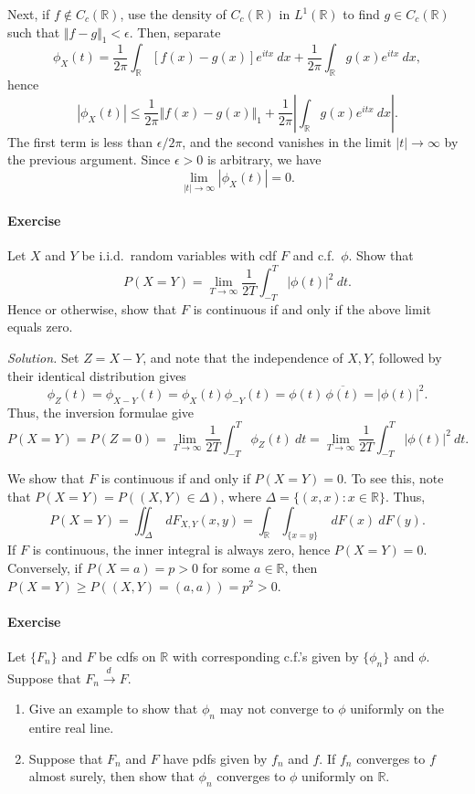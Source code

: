 \documentclass[10pt]{article}
\newcounter{prob}
\newcommand{\problem}{\stepcounter{prob}\paragraph{Exercise \arabic{prob}}}
\newcommand{\solution}{\textit{Solution.} }
\newcommand{\R}{\mathbb{R}}
\newcommand{\tod}{\overset{d\,}{\longrightarrow}}
\begin{document}
    Next, if $f \notin C_c(\R)$, use the density of $C_c(\R)$ in $L^1(\R)$ to find $g
    \in C_c(\R)$ such that $\Vert f - g\Vert_1 < \epsilon$. Then, separate \[
        \phi_X(t) = \frac{1}{2\pi} \int_\R [f(x) - g(x)] e^{itx}\:dx + \frac{1}{2\pi}
        \int_\R g(x) e^{itx}\:dx,
    \] hence \[
        |\phi_X(t)| \leq \frac{1}{2\pi} \Vert f(x) - g(x)\Vert_1 + \frac{1}{2\pi}
        |\int_\R g(x) e^{itx}\:dx|.
    \] The first term is less than $\epsilon / 2\pi$, and the second vanishes in the
    limit $|t| \to \infty$ by the previous argument. Since $\epsilon > 0$ is
    arbitrary, we have \[
        \lim_{|t| \to \infty} |\phi_X(t)| = 0.
    \]


    \problem Let $X$ and $Y$ be i.i.d.\ random variables with cdf $F$ and c.f.\
    $\phi$. Show that \[
        P(X = Y) = \lim_{T \to \infty} \frac{1}{2T} \int_{-T}^T |\phi(t)|^2 \:dt.
    \] Hence or otherwise, show that $F$ is continuous if and only if the above limit
    equals zero.

    \solution Set $Z = X - Y$, and note that the independence of $X, Y$, followed by
    their identical distribution gives \[
        \phi_{Z}(t) = \phi_{X - Y}(t) = \phi_{X}(t) \phi_{-Y}(t) = \phi(t)\,
        \overline{\phi(t)} = |\phi(t)|^2.
    \] Thus, the inversion formulae give \[
        P(X = Y) = P(Z = 0) = \lim_{T \to \infty} \frac{1}{2T} \int_{-T}^T \phi_Z(t)
        \:dt = \lim_{T \to \infty} \frac{1}{2T} \int_{-T}^T |\phi(t)|^2 \:dt.
    \]

    We show that $F$ is continuous if and only if $P(X = Y) = 0$. To see this, note
    that $P(X = Y) = P((X, Y) \in \Delta)$, where $\Delta = \{(x, x) : x \in \R\}$.
    Thus, \[
        P(X = Y) = \iint_\Delta \:dF_{X, Y}(x, y) = \int_\R \int_{\{x = y\}} \:dF(x)
        \:dF(y).
    \] If $F$ is continuous, the inner integral is always zero, hence $P(X = Y) = 0$.
    Conversely, if $P(X = a) = p > 0$ for some $a \in \R$, then $P(X = Y) \geq P((X,
    Y) = (a, a)) = p^2 > 0$.


    \problem Let $\{F_n\}$ and $F$ be cdfs on $\R$ with corresponding c.f.'s given by
    $\{\phi_n\}$ and $\phi$. Suppose that $F_n \tod F$.
    \begin{enumerate}
        \item Give an example to show that $\phi_n$ may not converge to $\phi$
        uniformly on the entire real line.

        \item Suppose that $F_n$ and $F$ have pdfs given by $f_n$ and $f$. If $f_n$
        converges to $f$ almost surely, then show that $\phi_n$ converges to $\phi$
        uniformly on $\R$.
    \end{enumerate}
\end{document}

